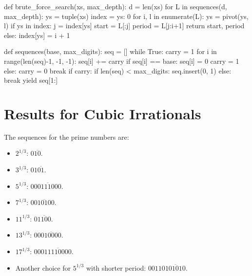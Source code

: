 \begin{minipage}{0.48\textwidth}
\begin{Python}[basicstyle=\tiny\ttfamily, frame={}]
def brute_force_search(xs, max_depth):
    d = len(xs)
    for L in sequences(d, max_depth):
        ys = tuple(xs)
        index = {ys: 0}
        for i, l in enumerate(L):
            ys = pivot(ys, l)
            if ys in index:
                j = index[ys]
                start = L[:j]
                period = L[j:i+1]
                return start, period
            else:
                index[ys] = i + 1
\end{Python}
\end{minipage}
\vrule width 1pt
\hfill
\begin{minipage}{0.48\textwidth}
\begin{Python}[basicstyle=\tiny\ttfamily, frame={}]
def sequences(base, max_digits):
    seq = []
    while True:
        carry = 1
        for i in range(len(seq)-1, -1, -1):
            seq[i] += carry
            if seq[i] == base:
                seq[i] = 0
                carry = 1
            else:
                carry = 0
                break
        if carry:
            if len(seq) < max_digits:
                seq.insert(0, 1)
            else:
                break
        yield seq[1:]
\end{Python}
\end{minipage}

\section{Results for Cubic Irrationals}

\begin{example}
  The sequences for the prime numbers are:
  \begin{itemize}
    \item $2^{1/3}$: $0\overline{10}$.
    \item $3^{1/3}$: $01\overline{01}$.
    \item $5^{1/3}$: $0\overline{00111000}$.
    \item $7^{1/3}$: $0\overline{010100}$.
    \item $11^{1/3}$: $0\overline{1100}$.
    \item $13^{1/3}$: $00\overline{010000}$.
    \item $17^{1/3}$: $000\overline{11110000}$.
    \item Another choice for $5^{1/3}$ with shorter period: $00110\overline{101010}$.
  \end{itemize}
\end{example}

